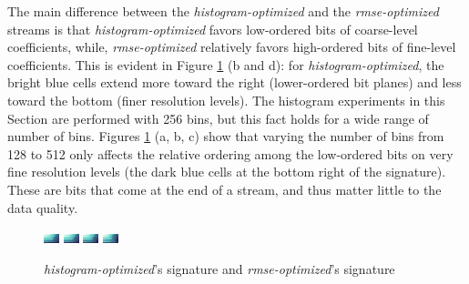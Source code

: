 The main difference between the \emph{histogram-optimized} and the \emph{rmse-optimized} streams is
that \emph{histogram-optimized} favors low-ordered bits of coarse-level coefficients, while,
\emph{rmse-optimized} relatively favors high-ordered bits of fine-level coefficients. This is
evident in Figure \ref{fig:histogram-signature-comparison} (b and d): for
\emph{histogram-optimized}, the bright blue cells extend more toward the right (lower-ordered bit
planes) and less toward the bottom (finer resolution levels). The histogram experiments in this
Section are performed with 256 bins, but this fact holds for a wide range of number of bins. Figures
\ref{fig:histogram-signature-comparison} (a, b, c) show that varying the number of bins from 128 to
512 only affects the relative ordering among the low-ordered bits on very fine resolution levels
(the dark blue cells at the bottom right of the signature). These are bits that come at the end of a
stream, and thus matter little to the data quality. 
 
\begin{figure}[h]
	\centering
	{\includegraphics[width=0.24\linewidth]{img/histogram/sig-GREEDY-(histogram-128).png}}
	{\includegraphics[width=0.24\linewidth]{img/histogram/sig-GREEDY-(histogram-256).png}}
	{\includegraphics[width=0.24\linewidth]{img/histogram/sig-GREEDY-(histogram-512).png}}
	{\includegraphics[width=0.24\linewidth]{img/histogram/sig-GREEDY-(rmse).png}}
	\caption{\emph{histogram-optimized}'s signature and \emph{rmse-optimized}'s signature}
	\label{fig:histogram-signature-comparison}
\end{figure}

